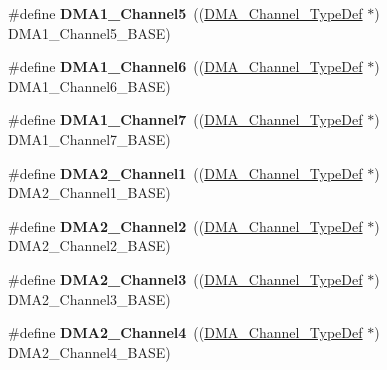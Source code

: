 \begin{DoxyCompactItemize}
\item 
\hypertarget{group___peripheral__declaration_ga06ff98ddef3c962795d2e2444004abff}{\#define {\bfseries D\-M\-A1\-\_\-\-Channel5}~((\hyperlink{struct_d_m_a___channel___type_def}{D\-M\-A\-\_\-\-Channel\-\_\-\-Type\-Def} $\ast$) D\-M\-A1\-\_\-\-Channel5\-\_\-\-B\-A\-S\-E)}\label{group___peripheral__declaration_ga06ff98ddef3c962795d2e2444004abff}

\item 
\hypertarget{group___peripheral__declaration_gac013c4376e4797831b5ddd2a09519df8}{\#define {\bfseries D\-M\-A1\-\_\-\-Channel6}~((\hyperlink{struct_d_m_a___channel___type_def}{D\-M\-A\-\_\-\-Channel\-\_\-\-Type\-Def} $\ast$) D\-M\-A1\-\_\-\-Channel6\-\_\-\-B\-A\-S\-E)}\label{group___peripheral__declaration_gac013c4376e4797831b5ddd2a09519df8}

\item 
\hypertarget{group___peripheral__declaration_ga4f9c23b3d1add93ed206b5c9afa5cda3}{\#define {\bfseries D\-M\-A1\-\_\-\-Channel7}~((\hyperlink{struct_d_m_a___channel___type_def}{D\-M\-A\-\_\-\-Channel\-\_\-\-Type\-Def} $\ast$) D\-M\-A1\-\_\-\-Channel7\-\_\-\-B\-A\-S\-E)}\label{group___peripheral__declaration_ga4f9c23b3d1add93ed206b5c9afa5cda3}

\item 
\hypertarget{group___peripheral__declaration_gad86c75e1ff89e03e15570f47962865c8}{\#define {\bfseries D\-M\-A2\-\_\-\-Channel1}~((\hyperlink{struct_d_m_a___channel___type_def}{D\-M\-A\-\_\-\-Channel\-\_\-\-Type\-Def} $\ast$) D\-M\-A2\-\_\-\-Channel1\-\_\-\-B\-A\-S\-E)}\label{group___peripheral__declaration_gad86c75e1ff89e03e15570f47962865c8}

\item 
\hypertarget{group___peripheral__declaration_ga316024020799373b9d8e35c316c74f24}{\#define {\bfseries D\-M\-A2\-\_\-\-Channel2}~((\hyperlink{struct_d_m_a___channel___type_def}{D\-M\-A\-\_\-\-Channel\-\_\-\-Type\-Def} $\ast$) D\-M\-A2\-\_\-\-Channel2\-\_\-\-B\-A\-S\-E)}\label{group___peripheral__declaration_ga316024020799373b9d8e35c316c74f24}

\item 
\hypertarget{group___peripheral__declaration_ga6dca52a79587e0ca9a5d669048b4c7eb}{\#define {\bfseries D\-M\-A2\-\_\-\-Channel3}~((\hyperlink{struct_d_m_a___channel___type_def}{D\-M\-A\-\_\-\-Channel\-\_\-\-Type\-Def} $\ast$) D\-M\-A2\-\_\-\-Channel3\-\_\-\-B\-A\-S\-E)}\label{group___peripheral__declaration_ga6dca52a79587e0ca9a5d669048b4c7eb}

\item 
\hypertarget{group___peripheral__declaration_ga612b396657695191ad740b0b59bc9f12}{\#define {\bfseries D\-M\-A2\-\_\-\-Channel4}~((\hyperlink{struct_d_m_a___channel___type_def}{D\-M\-A\-\_\-\-Channel\-\_\-\-Type\-Def} $\ast$) D\-M\-A2\-\_\-\-Channel4\-\_\-\-B\-A\-S\-E)}\label{group___peripheral__declaration_ga612b396657695191ad740b0b59bc9f12}


\end{DoxyCompactItemize}
